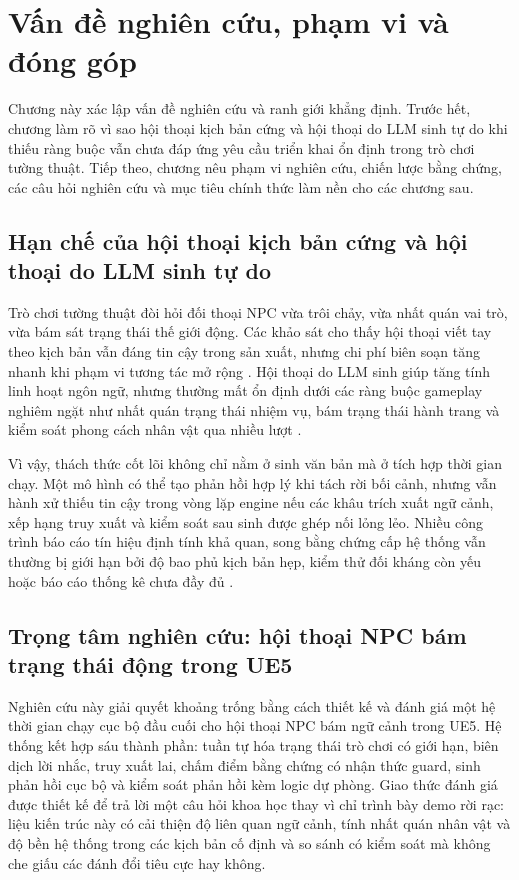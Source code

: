 ﻿\documentclass[a4paper,12pt]{article}
\begin{document}
\section{Vấn đề nghiên cứu, phạm vi và đóng góp}
Chương này xác lập vấn đề nghiên cứu và ranh giới khẳng định. Trước hết, chương làm rõ vì sao hội thoại kịch bản cứng và hội thoại do LLM sinh tự do khi thiếu ràng buộc vẫn chưa đáp ứng yêu cầu triển khai ổn định trong trò chơi tường thuật. Tiếp theo, chương nêu phạm vi nghiên cứu, chiến lược bằng chứng, các câu hỏi nghiên cứu và mục tiêu chính thức làm nền cho các chương sau.

\subsection{Hạn chế của hội thoại kịch bản cứng và hội thoại do LLM sinh tự do}
Trò chơi tường thuật đòi hỏi đối thoại NPC vừa trôi chảy, vừa nhất quán vai trò, vừa bám sát trạng thái thế giới động. Các khảo sát cho thấy hội thoại viết tay theo kịch bản vẫn đáng tin cậy trong sản xuất, nhưng chi phí biên soạn tăng nhanh khi phạm vi tương tác mở rộng \cite{Gallotta2024Survey,Sweetser2024Scoping}. Hội thoại do LLM sinh giúp tăng tính linh hoạt ngôn ngữ, nhưng thường mất ổn định dưới các ràng buộc gameplay nghiêm ngặt như nhất quán trạng thái nhiệm vụ, bám trạng thái hành trang và kiểm soát phong cách nhân vật qua nhiều lượt \cite{Park2023GenerativeAgents,Gallotta2024Survey,Sweetser2024Scoping}.

Vì vậy, thách thức cốt lõi không chỉ nằm ở sinh văn bản mà ở tích hợp thời gian chạy. Một mô hình có thể tạo phản hồi hợp lý khi tách rời bối cảnh, nhưng vẫn hành xử thiếu tin cậy trong vòng lặp engine nếu các khâu trích xuất ngữ cảnh, xếp hạng truy xuất và kiểm soát sau sinh được ghép nối lỏng lẻo. Nhiều công trình báo cáo tín hiệu định tính khả quan, song bằng chứng cấp hệ thống vẫn thường bị giới hạn bởi độ bao phủ kịch bản hẹp, kiểm thử đối kháng còn yếu hoặc báo cáo thống kê chưa đầy đủ \cite{Gallotta2024Survey,Rao2024Minecraft}.

\subsection{Trọng tâm nghiên cứu: hội thoại NPC bám trạng thái động trong UE5}
Nghiên cứu này giải quyết khoảng trống bằng cách thiết kế và đánh giá một hệ thời gian chạy cục bộ đầu cuối cho hội thoại NPC bám ngữ cảnh trong UE5. Hệ thống kết hợp sáu thành phần: tuần tự hóa trạng thái trò chơi có giới hạn, biên dịch lời nhắc, truy xuất lai, chấm điểm bằng chứng có nhận thức guard, sinh phản hồi cục bộ và kiểm soát phản hồi kèm logic dự phòng. Giao thức đánh giá được thiết kế để trả lời một câu hỏi khoa học thay vì chỉ trình bày demo rời rạc: liệu kiến trúc này có cải thiện độ liên quan ngữ cảnh, tính nhất quán nhân vật và độ bền hệ thống trong các kịch bản cố định và so sánh có kiểm soát mà không che giấu các đánh đổi tiêu cực hay không.
\end{document}

